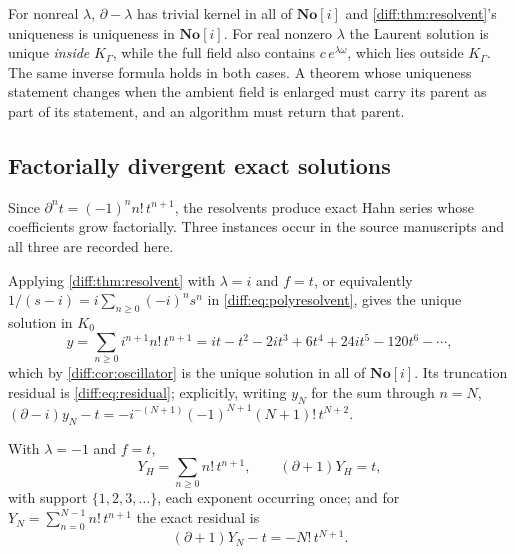 \documentclass[11pt,letterpaper]{article}
\numberwithin{equation}{section}
\theoremstyle{definition}
\theoremstyle{remark}
\newcommand{\SC}{\mathbf{No}[i]}
\newcommand{\der}{\partial}
\begin{document}
\begin{remark}
\label{diff:rem:parentselection}
For nonreal $\lambda$, $\der-\lambda$ has trivial kernel in all of $\SC$ and
\cref{diff:thm:resolvent}'s uniqueness is uniqueness in $\SC$. For real
nonzero $\lambda$ the Laurent solution is unique \emph{inside} $K_{\Gamma}$,
while the full field also contains $c\,e^{\lambda\omega}$, which lies outside
$K_{\Gamma}$. The same inverse formula holds in both cases. A theorem whose
uniqueness statement changes when the ambient field is enlarged must carry its
parent as part of its statement, and an algorithm must return that parent.
\end{remark}

\subsection{Factorially divergent exact solutions}
\label{diff:sub:factorial}

Since $\der^{n}t=(-1)^{n}n!\,t^{n+1}$, the resolvents produce exact Hahn
series whose coefficients grow factorially. Three instances occur in the
source manuscripts and all three are recorded here.

\begin{example}[$(\der-i)y=t$]
\label{diff:ex:factorialfirst}
Applying \cref{diff:thm:resolvent} with $\lambda=i$ and $f=t$, or equivalently
$1/(s-i)=i\sum_{n\geq0}(-i)^{n}s^{n}$ in
\cref{diff:eq:polyresolvent}, gives the unique solution in $K_{0}$
\begin{equation}\label{diff:eq:factorialfirst}
 y=\sum_{n\geq0}i^{n+1}n!\,t^{n+1}
 =it-t^{2}-2it^{3}+6t^{4}+24it^{5}-120t^{6}-\cdots,
\end{equation}
which by \cref{diff:cor:oscillator} is the unique solution in all of $\SC$.
Its truncation residual is \cref{diff:eq:residual}; explicitly, writing
$y_{N}$ for the sum through $n=N$,
$(\der-i)y_{N}-t=-i^{-(N+1)}(-1)^{N+1}(N+1)!\,t^{N+2}$.
\end{example}

\begin{example}[$(\der+1)Y=t$, and a beyond-all-orders ambiguity]
\label{diff:ex:factorialsecond}
With $\lambda=-1$ and $f=t$,
\begin{equation}\label{diff:eq:factorialsecond}
 Y_{H}=\sum_{n\geq0}n!\,t^{n+1},\qquad (\der+1)Y_{H}=t,
\end{equation}
with support $\{1,2,3,\dots\}$, each exponent occurring once; and for
$Y_{N}=\sum_{n=0}^{N-1}n!\,t^{n+1}$ the exact residual is
\begin{equation}\label{diff:eq:factorialresidual}
 (\der+1)Y_{N}-t=-N!\,t^{N+1}.
\end{equation}
\end{example}
\end{document}
